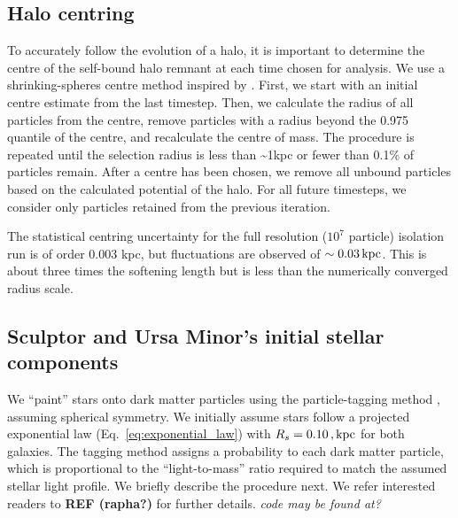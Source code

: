\subsection{Halo centring}\label{sec:shrinking_spheres}

To accurately follow the evolution of a halo, it is important to
determine the centre of the self-bound halo remnant at each time chosen
for analysis. We use a shrinking-spheres centre method inspired by
\citet{power+2003}. First, we start with an initial centre estimate from
the last timestep. Then, we calculate the radius of all particles from
the centre, remove particles with a radius beyond the 0.975 quantile of
the centre, and recalculate the centre of mass. The procedure is
repeated until the selection radius is less than \textasciitilde1kpc or
fewer than 0.1\% of particles remain. After a centre has been chosen, we
remove all unbound particles based on the \gadget{} calculated potential
of the halo. For all future timesteps, we consider only particles
retained from the previous iteration.

The statistical centring uncertainty for the full resolution (\(10^7\)
particle) isolation run is of order 0.003 kpc, but fluctuations are
observed of \(\sim 0.03\,{\rm kpc}\). This is about three times the softening
length but is less than the numerically converged radius scale.

\subsection{Sculptor and Ursa Minor's initial stellar
components}\label{sec:painting_stars}

We ``paint'' stars onto dark matter particles using the particle-tagging
method \citep[e.g.,][]{bullock+johnston2005}, assuming spherical
symmetry. We initially assume stars follow a projected exponential law
(Eq.~\ref{eq:exponential_law}) with \(R_s = 0.10\,,{\rm kpc}\) for both
galaxies. The tagging method assigns a probability to each dark matter
particle, which is proportional to the ``light-to-mass'' ratio required
to match the assumed stellar light profile. We briefly describe the
procedure next. We refer interested readers to \textbf{REF (rapha?)} for
further details. \emph{code may be found at?}

